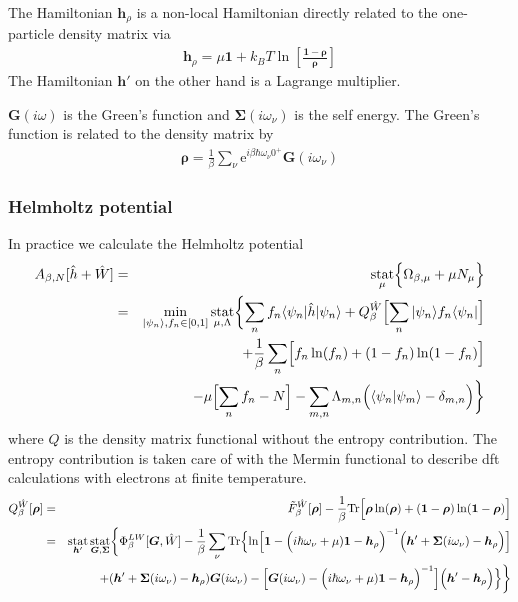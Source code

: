 \documentclass[11pt,a4paper]{report}
\newcommand{\e}[1]{\mathrm{e}^{#1}}%
\newcommand{\mat}[1]{\bm{#1}}  %
\DeclareMathOperator*{\stat}{stat}
\begin{document}
The Hamiltonian $\mat{h}_\rho$ is a non-local Hamiltonian directly
related to the one-particle density matrix via
\begin{eqnarray}
\mat{h}_\rho=\mu\mat{1}+k_BT\ln
\left[\frac{\mat{1}-\mat{\rho}}{\mat{\rho}}\right]
\end{eqnarray}
The Hamiltonian $\mat{h}'$ on the other hand is a Lagrange multiplier.

$\mat{G}(i\omega)$ is the Green's function and $\mat{\Sigma}(i\omega_\nu)$
is the self energy. The Green's function is related to the density matrix by
\begin{eqnarray}
\mat{\rho}=\frac{1}{\beta}
\sum_\nu\e{i\beta\hbar\omega_\nu0^+}\mat{G}(i\omega_\nu)
\label{eq:rhoofg}
\end{eqnarray}



\subsubsection{Helmholtz potential}
In practice we calculate the Helmholtz potential
\begin{eqnarray}
A_{\beta,N}[\hat{h}+\hat{W}]
&=&\stat_\mu\Bigl\lbrace\Omega_{\beta,\mu}+\mu N_\mu\Bigr\rbrace
\nonumber\\
&=&\min_{|\psi_n\rangle,f_n\in[0,1]}\stat_{\mu,\Lambda}
\biggl\lbrace\sum_n f_n\langle\psi_n|\hat{h}|\psi_n\rangle
+Q_\beta^{\hat{W}}\Bigl[\sum_n|\psi_n\rangle f_n\langle\psi_n|\Bigr]
\nonumber\\
&&+\frac{1}{\beta}\sum_n\Bigl[f_n\ln(f_n)+(1-f_n)\ln(1-f_n)\Bigr]
\nonumber\\
&&
-\mu\Bigl[\sum_n f_n-N\Bigr]
-\sum_{m,n}\Lambda_{m,n}\Bigl(\langle\psi_n|\psi_m\rangle-\delta_{m,n}\Bigr)
\biggr\rbrace
\label{eq:hp}
\end{eqnarray}
where $Q$ is the density matrix functional without the entropy
contribution.  The entropy contribution is taken care of with the
Mermin functional to describe dft calculations with electrons at
finite temperature.
\begin{eqnarray}
Q^{\hat{W}}_\beta[\mat{\rho}]
&=&\tilde{F}^{\hat{W}}_\beta[\mat{\rho}]
-
\frac{1}{\beta}\Tr\Bigl[
\mat{\rho}\ln(\mat{\rho})+(\mat{1}-\mat{\rho})\ln(\mat{1}-\mat{\rho})\Bigr]
\nonumber\\
&=&
\stat_{\mat{h}'}\stat_{\mat{G},\mat{\Sigma}}
\biggl\lbrace
\Phi^{LW}_\beta[\mat{G},\hat{W}]
-\frac{1}{\beta}\sum_\nu\Tr\Bigl\lbrace
\ln\Bigl[
\mat{1}-
\Bigl(i\hbar\omega_\nu+\mu)\mat{1}-\mat{h}_{\rho}\Bigr)^{-1}
\Bigl(\mat{h}'+\mat{\Sigma}(i\omega_\nu)-\mat{h}_{\rho}\Bigr)
\Bigr]
\nonumber\\&&
+(\mat{h}'+\mat{\Sigma}(i\omega_\nu)-\mat{h}_\rho)\mat{G}(i\omega_\nu)
-
\Bigl[
\mat{G}(i\omega_\nu)
-\Bigl(i\hbar\omega_\nu+\mu)\mat{1}-\mat{h}_{\rho}\Bigr)^{-1}
\Bigr]
\Bigl(\mat{h}'-\mat{h}_\rho\Bigr)\Bigr\rbrace
\biggr\rbrace
\label{eq:dmfQgreen}
\end{eqnarray}
\end{document}
